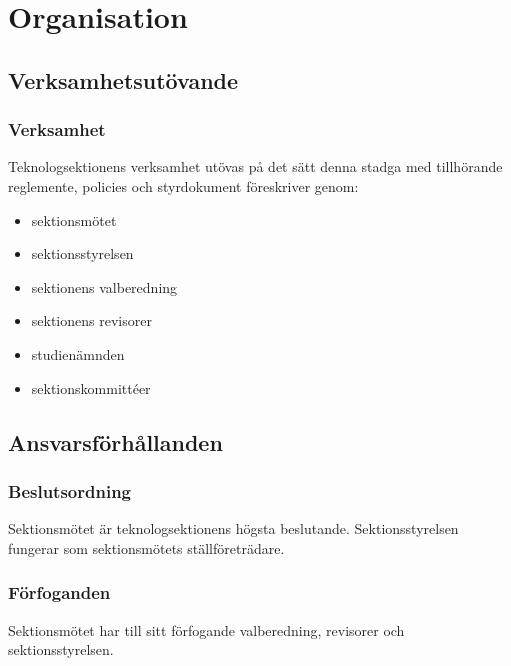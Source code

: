 \section{Organisation}

\subsection{Verksamhetsutövande}

\subsubsection{Verksamhet}

Teknologsektionens verksamhet utövas på det sätt denna stadga med tillhörande reglemente, policies och styrdokument föreskriver genom:

\begin{itemize}
	\item sektionsmötet
	\item sektionsstyrelsen \STYRIT{}
	\item sektionens valberedning
	\item sektionens revisorer
	\item studienämnden \SNIT{}
	\item sektionskommittéer
\end{itemize}

\subsection{Ansvarsförhållanden}

\subsubsection{Beslutsordning}
Sektionsmötet är teknologsektionens högsta beslutande. Sektionsstyrelsen fungerar som sektionsmötets ställföreträdare.

\subsubsection{Förfoganden}
Sektionsmötet har till sitt förfogande valberedning, revisorer och sektionsstyrelsen.

